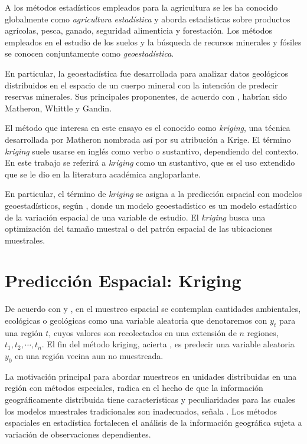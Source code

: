 \documentclass[14pt]{extarticle}
\begin{document}
A los métodos estadísticos empleados para la agricultura se les ha conocido globalmente como \textit{agricultura estadística} y aborda estadísticas sobre productos agrícolas, pesca, ganado, seguridad alimenticia y forestación\cite{Benedetti.2015}. Los métodos empleados en el estudio de los suelos y la búsqueda de recursos minerales y fósiles se conocen conjuntamente como \textit{geoestadística}\cite{Thompson.2012}.

En particular, la geoestadística fue desarrollada para analizar datos geológicos distribuidos en el espacio de un cuerpo mineral con la intención de predecir reservas minerales\cite{Cressie.1986}. Sus principales proponentes, de acuerdo con \cite{Cressie.1986}, habrían sido Matheron, Whittle y Gandin. 

El método que interesa en este ensayo es el conocido como \textit{kriging}, una técnica desarrollada por Matheron\cite{Benedetti.2015, Cressie.1986} nombrada así por su atribución a Krige\cite{Cressie.1986}. El término \textit{kriging} suele usarse en inglés como verbo o sustantivo, dependiendo del contexto. En este trabajo se referirá a \textit{kriging} como un sustantivo, que es el uso extendido que se le dio en la literatura académica angloparlante\cite{Cressie.1986, Journel.1987}.

En particular, el término de \textit{kriging} se asigna a la predicción espacial con modelos geoestadísticos, según \cite{Brus.2022}, donde un modelo geoestadístico es un modelo estadístico de la variación espacial de una variable de estudio. El \textit{kriging} busca una optimización del tamaño muestral o del patrón espacial de las ubicaciones muestrales\cite{Brus.2022}. 

\section{Predicción Espacial: Kriging}
De acuerdo con \cite{Thompson.2012} y \cite{Alinghaus.1996}, en el muestreo espacial se contemplan cantidades ambientales, ecológicas o geológicas como una variable aleatoria que denotaremos con $y_t$ para una región $t$, cuyos valores son recolectados en una extensión de $n$ regiones, $t_1, t_2, \cdots, t_n$. El fin del método kriging, acierta \cite{Benedetti.2015}, es predecir una variable aleatoria $y_0$ en una región vecina aun no muestreada.  

La motivación principal para abordar muestreos en unidades distribuidas en una región con métodos especiales, radica en el hecho de que la información geográficamente distribuida tiene características y peculiaridades para las cuales los modelos muestrales tradicionales son inadecuados, señala \cite{Benedetti.2015}. Los métodos espaciales en estadística fortalecen el análisis de la información geográfica sujeta a variación de observaciones dependientes\cite{Alinghaus.1996}. 
\end{document}
